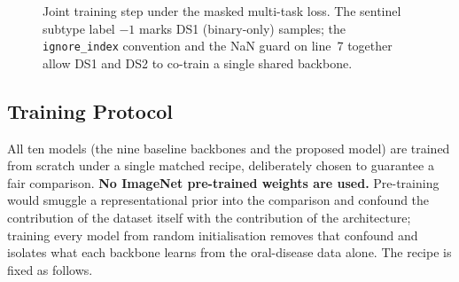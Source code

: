 \begin{figure}[!t]
  \centering
  \caption{Joint training step under the masked multi-task loss. The
  sentinel subtype label $-1$ marks DS1 (binary-only) samples; the
  \texttt{ignore\_index} convention and the NaN guard on line~7 together
  allow DS1 and DS2 to co-train a single shared backbone.}
  \label{alg:train}
\end{figure}

\subsection{Training Protocol}\label{ssec:training}

All ten models (the nine baseline backbones and the proposed model)
are trained from scratch under a single matched recipe, deliberately chosen
to guarantee a fair comparison. \textbf{No ImageNet pre-trained weights are
used.} Pre-training would smuggle a representational prior into the
comparison and confound the contribution of the dataset itself with the
contribution of the architecture; training every model from random
initialisation removes that confound and isolates what each backbone learns
from the oral-disease data alone. The recipe is fixed as follows.

